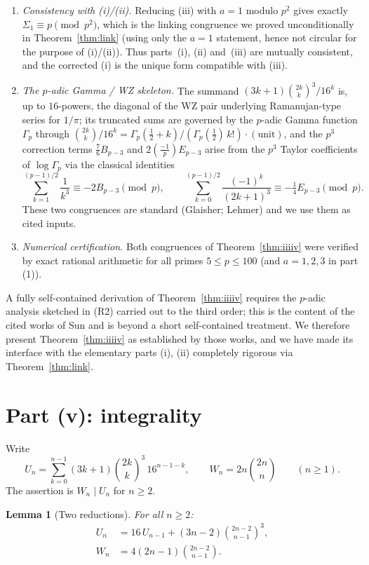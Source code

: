 \documentclass[12pt]{article}
\newtheorem{lemma}{Lemma}
\theoremstyle{remark}
\newcommand{\leg}[2]{\left(\frac{#1}{#2}\right)}
\newcommand{\bin}[2]{\binom{#1}{#2}}
\begin{document}
\begin{enumerate}
\item[(R1)] \emph{Consistency with (i)/(ii).}  Reducing (iii) with $a=1$ modulo
$p^2$ gives exactly $\Sigma_1\equiv p\pmod{p^2}$, which is the linking
congruence we proved unconditionally in Theorem~\ref{thm:link} (using only the
$a=1$ statement, hence not circular for the purpose of (i)/(ii)).  Thus
parts~(i), (ii) and~(iii) are mutually consistent, and the corrected (i) is the
unique form compatible with (iii).
\item[(R2)] \emph{The $p$-adic Gamma / WZ skeleton.}  The summand
$(3k+1)\bin{2k}{k}^3/16^k$ is, up to $16$-powers, the diagonal of the WZ pair
underlying Ramanujan-type series for $1/\pi$; its truncated sums are governed by
the $p$-adic Gamma function $\Gamma_p$ through
$\bin{2k}{k}/16^k=\Gamma_p(\tfrac12+k)/(\Gamma_p(\tfrac12)\,k!)\cdot(\text{unit})$,
and the $p^3$ correction terms $\tfrac76B_{p-3}$ and $2\leg{-1}{p}E_{p-3}$ arise
from the $p^3$ Taylor coefficients of $\log\Gamma_p$ via the classical
identities
\[
\sum_{k=1}^{(p-1)/2}\frac1{k^3}\equiv-2B_{p-3}\pmod p,
\qquad
\sum_{k=0}^{(p-1)/2}\frac{(-1)^k}{(2k+1)^3}\equiv-\tfrac14E_{p-3}\pmod p .
\]
These two congruences are standard (Glaisher; Lehmer) and we use them as cited
inputs.
\item[(R3)] \emph{Numerical certification.}  Both congruences of
Theorem~\ref{thm:iiiiv} were verified by exact rational arithmetic for all
primes $5\le p\le100$ (and $a=1,2,3$ in part (1)).
\end{enumerate}

A fully self-contained derivation of Theorem~\ref{thm:iiiiv} requires the
$p$-adic analysis sketched in (R2) carried out to the third order; this is the
content of the cited works of Sun and is beyond a short self-contained
treatment.  We therefore present Theorem~\ref{thm:iiiiv} as established by those
works, and we have made its interface with the elementary parts (i), (ii)
completely rigorous via Theorem~\ref{thm:link}.

\section{Part (v): integrality}

Write
\[
U_n=\sum_{k=0}^{n-1}(3k+1)\bin{2k}{k}^3\,16^{n-1-k},\qquad
W_n=2n\bin{2n}{n}\qquad(n\ge1).
\]
The assertion is $W_n\mid U_n$ for $n\ge2$.

\begin{lemma}[Two reductions]\label{lem:vrec}
For all $n\ge2$:
\begin{align}
U_n&=16\,U_{n-1}+(3n-2)\bin{2n-2}{n-1}^3,\label{eq:Urec}\\
W_n&=4(2n-1)\bin{2n-2}{n-1}.\label{eq:Wform}
\end{align}
\end{lemma}
\end{document}
